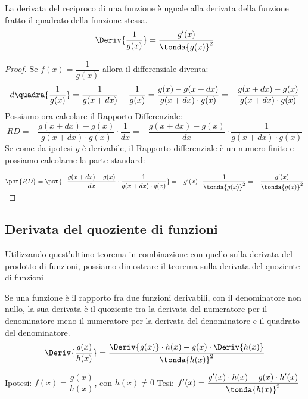 \begin{teorema}
\label{teo:diff_reciproco_f}
La derivata del reciproco di una funzione è uguale alla derivata della 
funzione fratto il quadrato della funzione stessa.
\[\Deriv{\dfrac{1}{g(x)}} = \dfrac{g'(x)}{\tonda{g(x)}^2}\]
\end{teorema}
\begin{proof}
Se \(f(x) = \dfrac{1}{g(x)}\) allora il differenziale diventa:
\[d \quadra{\frac{1}{g(x)}} = \frac{1}{g(x+dx)} - \frac{1}{g(x)} =
  \frac{g(x) - g(x+dx)}{g(x+dx) \cdot g(x)} =
  - \frac{g(x+dx) - g(x)}{g(x+dx) \cdot g(x)}\]
Possiamo ora calcolare il Rapporto Differenziale:
\[RD = 
  -\frac{g(x+dx) - g(x)}{g(x+dx) \cdot g(x)} \cdot 
  \frac{1}{dx} =
  -\frac{g(x+dx) - g(x)}{dx} \cdot 
  \frac{1}{g(x+dx) \cdot g(x)}\]
Se come da ipotesi \(g\) è derivabile, il Rapporto differenziale è un numero 
finito e possiamo calcolarne la parte standard:

\(\pst{RD} = 
  \pst{-\dfrac{g(x+dx) - g(x)}{dx} \cdot 
  \dfrac{1}{g(x+dx) \cdot g(x)}} =
  -g'(x) \cdot \dfrac{1}{\tonda{g(x)}^2} =
  -\dfrac{g'(x)}{\tonda{g(x)}^2}\)
\end{proof}

\subsection{Derivata del quoziente di funzioni}
\label{subsec:differenziazione_derivataquoziente}

Utilizzando quest'ultimo teorema in combinazione con quello sulla derivata del 
prodotto di funzioni, possiamo dimostrare il teorema sulla derivata del 
quoziente di funzioni
\begin{teorema}
Se una funzione è il rapporto fra due funzioni derivabili, 
con il denominatore non nullo, 
la sua derivata è il quoziente tra 
la derivata del numeratore per il denominatore meno il numeratore per la 
derivata del denominatore e
il quadrato del denominatore.
\[\Deriv{\dfrac{\mathit{g}(x)}{h(x)}} =
\dfrac{\Deriv{\mathit{g}(x)} \cdot h(x)-\mathit{g}(x) \cdot \Deriv{h(x)}}
      {\tonda{h(x)}^2}\]
\end{teorema}
\noindent Ipotesi: \(f(x)=\dfrac{\mathit{g}(x)}{h(x)}\), 
con \(h(x)\neq 0\) \tab 
Tesi: 
\(f'(x) = \dfrac{\mathit{g}'(x) \cdot h(x)-\mathit{g}(x) \cdot h'(x)}
             {\tonda{h(x)}^2}\)

